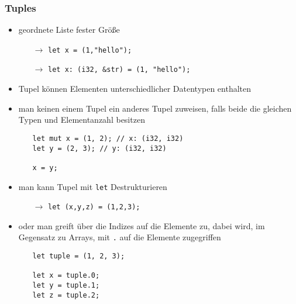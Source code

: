 \documentclass[a4paper,12pt]{article}
\begin{document}
\subsubsection*{Tuples}
	\begin{itemize}
	  \item geordnete Liste fester Größe
	  \begin{itemize}
	      \item[$\rightarrow$] \verb|let x = (1,"hello");| 
		  \item[$\rightarrow$] \verb|let x: (i32, &str) = (1, "hello");| 
	  \end{itemize}
	  \item Tupel können Elementen unterschiedlicher Datentypen enthalten
	  \item man keinen einem Tupel ein anderes Tupel zuweisen, falls beide die gleichen Typen und Elementanzahl besitzen
	  \begin{itemize}
	  \item[]
\begin{verbatim}
let mut x = (1, 2); // x: (i32, i32)
let y = (2, 3); // y: (i32, i32)

x = y;
\end{verbatim}
	  \end{itemize}
	 \item man kann Tupel mit \verb|let| Destrukturieren 
	 \begin{itemize}
	     \item[$\rightarrow$] \verb|let (x,y,z) = (1,2,3);| 
	 \end{itemize}
	 \item oder man greift über die Indizes auf die Elemente zu, dabei wird, im Gegensatz zu Arrays, mit \verb|.| auf die Elemente zugegriffen
	 \begin{itemize}
	     \item[]
	     \begin{verbatim}
let tuple = (1, 2, 3);

let x = tuple.0;
let y = tuple.1;
let z = tuple.2;	     
		 \end{verbatim}	      
	 \end{itemize}
	\end{itemize}
\end{document}
